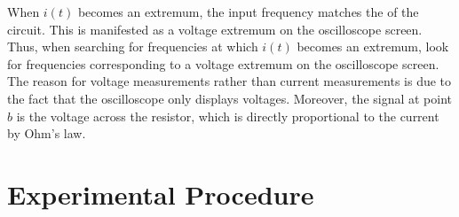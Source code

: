 \documentclass[12pt, a4paper, oneside, openright, titlepage]{book}
\begin{document}
\noindent When $i(t)$ becomes an extremum, the input frequency matches the  of the circuit. This is manifested as a voltage extremum on the oscilloscope screen. Thus, when searching for frequencies at which $i(t)$ becomes an extremum, look for frequencies corresponding to a voltage extremum on the oscilloscope screen. The reason for voltage measurements rather than current measurements is due to the fact that the oscilloscope only displays voltages. Moreover, the signal at point $b$ is the voltage across the resistor, which is directly proportional to the current by Ohm's law.

\section{Experimental Procedure}
\end{document}
